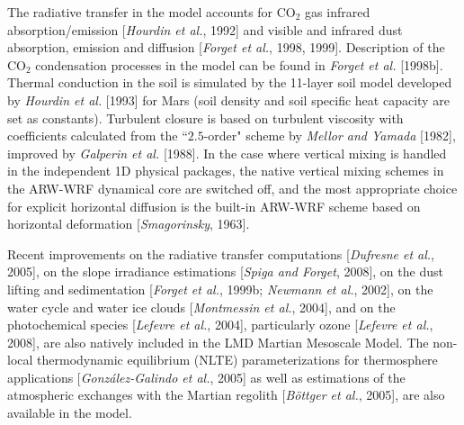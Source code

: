 \sk
The radiative transfer in the model accounts for CO$_2$ gas infrared absorption/emission [\textit{Hourdin et al.}, 1992]\nocite{Hour:92} and visible and infrared dust absorption, emission and diffusion [\textit{Forget et al.}, 1998, 1999]\nocite{Forg:98grl}. Description of the CO$_2$ condensation processes in the model can be found in \textit{Forget et al.} [1998b]\nocite{Forg:98}. Thermal conduction in the soil is simulated by the 11-layer soil model developed by \textit{Hourdin et al.} [1993]\nocite{Hour:93} for Mars (soil density and soil specific heat capacity are set as constants). Turbulent closure is based on turbulent viscosity with coefficients calculated from the ``$2.5$-order" scheme by \textit{Mellor and Yamada} [1982]\nocite{Mell:82}, improved by \textit{Galperin et al.} [1988]\nocite{Galp:88}. In the case where vertical mixing is handled in the independent 1D physical packages, the native vertical mixing schemes in the ARW-WRF dynamical core are switched off, and the most appropriate choice for explicit horizontal diffusion is the built-in ARW-WRF scheme based on horizontal deformation [\textit{Smagorinsky}, 1963]\nocite{Smag:63}.

\sk
Recent improvements on the radiative transfer computations [\textit{Dufresne et al.}, 2005]\nocite{Dufr:05}, on the slope irradiance estimations [\textit{Spiga and Forget}, 2008]\nocite{Spig:08grl}, on the dust lifting and sedimentation [\textit{Forget et al.}, 1999b\nocite{Forg:99icm5}; \textit{Newmann et al.}, 2002]\nocite{Newm:02a}, on the water cycle and water ice clouds [\textit{Montmessin et al.}, 2004]\nocite{Mont:04}, and on the photochemical species [\textit{Lefevre et al.}, 2004]\nocite{Lefe:04}, particularly ozone [\textit{Lefevre et al.}, 2008]\nocite{Lefe:08}, are also natively included in the LMD Martian Mesoscale Model. The non-local thermodynamic equilibrium (NLTE) parameterizations for thermosphere applications [\textit{Gonz\'alez-Galindo et al.}, 2005\nocite{Gonz:05}] as well as estimations of the atmospheric exchanges with the Martian regolith [\textit{B\"ottger et al.}, 2005]\nocite{Bott:05}, are also available in the model.


